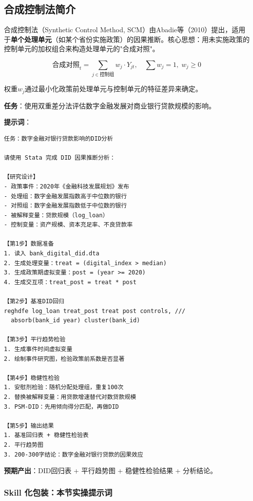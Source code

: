 \subsection{合成控制法简介}

合成控制法（Synthetic Control Method, SCM）由Abadie等（2010）提出，适用于\textbf{单个处理单元}（如某个省份实施政策）的因果推断。核心思想：用未实施政策的控制单元的加权组合来构造处理单元的"合成对照"。

\[
\text{合成对照}_t = \sum_{j \in \text{控制组}} w_j \cdot Y_{jt}, \quad \sum w_j = 1, \; w_j \geq 0
\]

权重$w_j$通过最小化政策前处理单元与控制单元的特征差异来确定。

\begin{practicebox}[实操：DID评估数字金融对银行贷款的影响]
\textbf{任务}：使用双重差分法评估数字金融发展对商业银行贷款规模的影响。

\textbf{提示词}：

\begin{lstlisting}
任务：数字金融对银行贷款影响的DID分析

请使用 Stata 完成 DID 因果推断分析：

【研究设计】
- 政策事件：2020年《金融科技发展规划》发布
- 处理组：数字金融发展指数高于中位数的银行
- 对照组：数字金融发展指数低于中位数的银行
- 被解释变量：贷款规模（log_loan）
- 控制变量：资产规模、资本充足率、不良贷款率

【第1步】数据准备
1. 读入 bank_digital_did.dta
2. 生成处理变量：treat = (digital_index > median)
3. 生成政策期虚拟变量：post = (year >= 2020)
4. 生成交互项：treat_post = treat * post

【第2步】基准DID回归
reghdfe log_loan treat_post treat post controls, ///
  absorb(bank_id year) cluster(bank_id)

【第3步】平行趋势检验
1. 生成事件时间虚拟变量
2. 绘制事件研究图，检验政策前系数是否显著

【第4步】稳健性检验
1. 安慰剂检验：随机分配处理组，重复100次
2. 替换被解释变量：用贷款增速替代对数贷款规模
3. PSM-DID：先用倾向得分匹配，再做DID

【第5步】输出结果
1. 基准回归表 + 稳健性检验表
2. 平行趋势图
3. 200-300字结论：数字金融对银行贷款的因果效应
\end{lstlisting}

\textbf{预期产出}：DID回归表 + 平行趋势图 + 稳健性检验结果 + 分析结论。
\end{practicebox}

\subsubsection{Skill 化包装：本节实操提示词}

